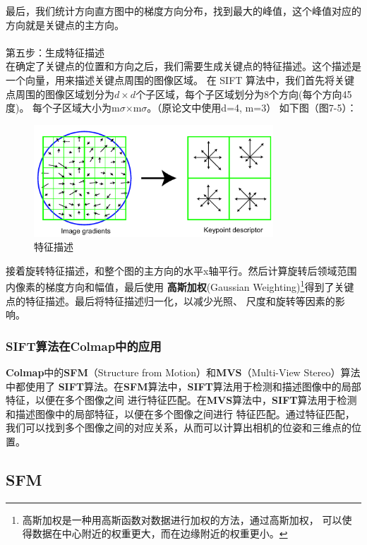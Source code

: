 \documentclass{nwputhesis}
\begin{document}
\indent
最后，我们统计方向直方图中的梯度方向分布，找到最大的峰值，这个峰值对应的方向就是关键点的主方向。\\
\\
第五步：生成特征描述\\
\indent
在确定了关键点的位置和方向之后，我们需要生成关键点的特征描述。这个描述是一个向量，用来描述关键点周围的图像区域。
在 SIFT 算法中，我们首先将关键点周围的图像区域划分为$d\times d$个子区域，每个子区域划分为8个方向(每个方向45度)。
每个子区域大小为m$\sigma$$\times$m$\sigma$。（原论文中使用d=4, m=3）
如下图（图7-5）：\\
\begin{figure}[H]
    \centering
    \includegraphics[width=0.8\textwidth]{picture/25.png}
    \caption{特征描述}
\end{figure}

\indent
接着旋转特征描述，和整个图的主方向的水平x轴平行。然后计算旋转后领域范围内像素的梯度方向和幅值，最后使用
\textbf{高斯加权}(Gaussian Weighting)\footnote{高斯加权是一种用高斯函数对数据进行加权的方法，通过高斯加权，
可以使得数据在中心附近的权重更大，而在边缘附近的权重更小。}得到了关键点的特征描述。最后将特征描述归一化，以减少光照、
尺度和旋转等因素的影响。\\

\subsubsection{SIFT算法在Colmap中的应用}
\indent
\textbf{Colmap}中的\textbf{SFM}（Structure from Motion）和\textbf{MVS}（Multi-View Stereo）算法中都使用了
\textbf{SIFT}算法。在\textbf{SFM}算法中，\textbf{SIFT}算法用于检测和描述图像中的局部特征，以便在多个图像之间
进行特征匹配。在\textbf{MVS}算法中，\textbf{SIFT}算法用于检测和描述图像中的局部特征，以便在多个图像之间进行
特征匹配。通过特征匹配，我们可以找到多个图像之间的对应关系，从而可以计算出相机的位姿和三维点的位置。\\
\makespace
\subsection{SFM}
\end{document}
